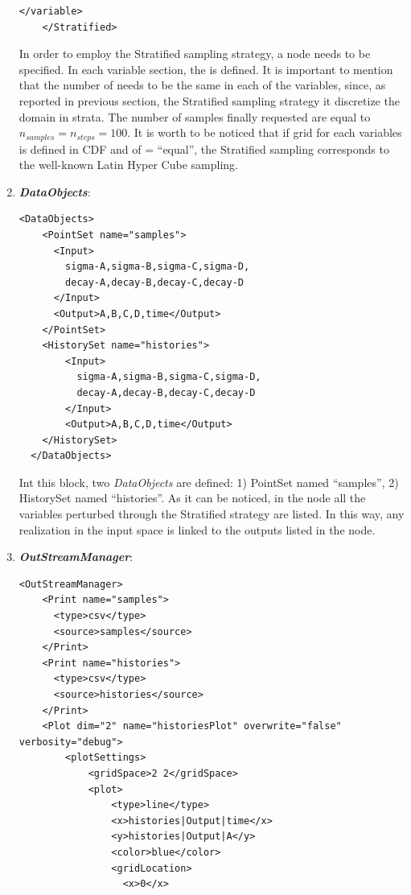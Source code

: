\begin{enumerate}
\begin{lstlisting}[style=XML,morekeywords={arg,extension,pauseAtEnd,overwrite}]
      </variable>
    </Stratified> 
\end{lstlisting}
  In order to employ the Stratified sampling strategy, a 
   node needs to be specified. In each variable section, the   is defined. 
  It is important to mention that the number of  needs to be the same in each of the variables,
  since, as reported in previous section, the Stratified sampling strategy it discretize the domain in strata. 
  The number of samples finally requested are equal to $n_{samples} = n_{steps} = 100$.
  It is worth to be noticed that if grid for each variables is defined in CDF and of   = ``equal'', the Stratified
  sampling corresponds to the well-known Latin Hyper Cube sampling.
   \item \textbf{\textit{DataObjects}}:
\begin{lstlisting}[style=XML,morekeywords={arg,extension,pauseAtEnd,overwrite}]
  <DataObjects>
    <PointSet name="samples">
      <Input>
        sigma-A,sigma-B,sigma-C,sigma-D,
        decay-A,decay-B,decay-C,decay-D
      </Input>
      <Output>A,B,C,D,time</Output>
    </PointSet>
    <HistorySet name="histories">
        <Input>
          sigma-A,sigma-B,sigma-C,sigma-D,
          decay-A,decay-B,decay-C,decay-D
        </Input>
        <Output>A,B,C,D,time</Output>
    </HistorySet>
  </DataObjects>
\end{lstlisting}
  Int this block, two \textit{DataObjects} are defined: 1) PointSet named 
  ``samples'', 2) HistorySet named ``histories''.
  As it can be noticed, in the  node all the variables 
  perturbed through the Stratified strategy are listed. In this way, any
  realization in the input space is linked to the outputs listed in  the 
   node.
   \item \textbf{\textit{OutStreamManager}}:   
\begin{lstlisting}[style=XML,morekeywords={arg,extension,pauseAtEnd,overwrite}]
  <OutStreamManager>
    <Print name="samples">
      <type>csv</type>
      <source>samples</source>
    </Print>
    <Print name="histories">
      <type>csv</type>
      <source>histories</source>
    </Print>
    <Plot dim="2" name="historiesPlot" overwrite="false" verbosity="debug">
        <plotSettings>
            <gridSpace>2 2</gridSpace>
            <plot>
                <type>line</type>
                <x>histories|Output|time</x>
                <y>histories|Output|A</y>
                <color>blue</color>
                <gridLocation>
                  <x>0</x>

\end{lstlisting}
\end{enumerate}
